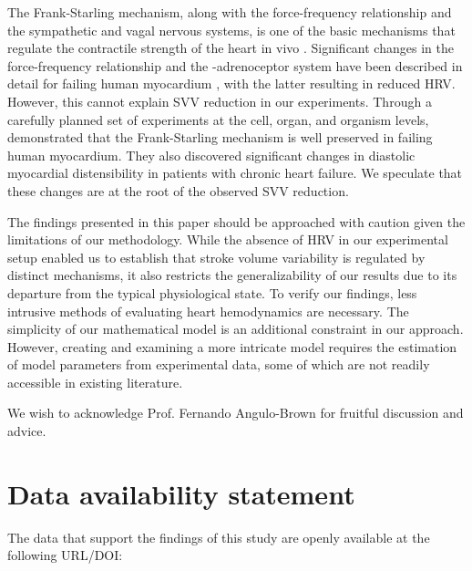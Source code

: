 \documentclass[%
preprint,
 amsmath,amssymb,
 aps,
]{revtex4-2}
\begin{document}
The Frank-Starling mechanism, along with the force-frequency relationship and the sympathetic and vagal nervous systems, is one of the basic mechanisms that regulate the contractile strength of the heart in vivo \citep{Holubarsch_1996}. Significant changes in the force-frequency relationship and the \textbeta-adrenoceptor system have been described in detail for failing human myocardium \citep{Mulieri_1992, Pieske_1992, Bristow_1982, Bristow_1989},  with the latter resulting in reduced HRV. However, this cannot explain SVV reduction in our experiments. Through a carefully planned set of experiments at the cell, organ, and organism levels, \citet{Holubarsch_1996} demonstrated that the Frank-Starling mechanism is well preserved in failing human myocardium. They also discovered significant changes in diastolic myocardial distensibility in patients with chronic heart failure. We speculate that these changes are at the root of the observed SVV reduction.

The findings presented in this paper should be approached with caution given the limitations of our methodology. While the absence of HRV in our experimental setup enabled us to establish that stroke volume variability is regulated by distinct mechanisms, it also restricts the generalizability of our results due to its departure from the typical physiological state. To verify our findings, less intrusive methods of evaluating heart hemodynamics are necessary. The simplicity of our mathematical model is an additional constraint in our approach. However, creating and examining a more intricate model requires the estimation of model parameters from experimental data, some of which are not readily accessible in existing literature.

\begin{acknowledgments}
We wish to acknowledge Prof. Fernando Angulo-Brown for fruitful discussion and advice.
\end{acknowledgments}

\section*{Data availability statement}

The data that support the findings of this study are openly available at the following URL/DOI:



\end{document}
